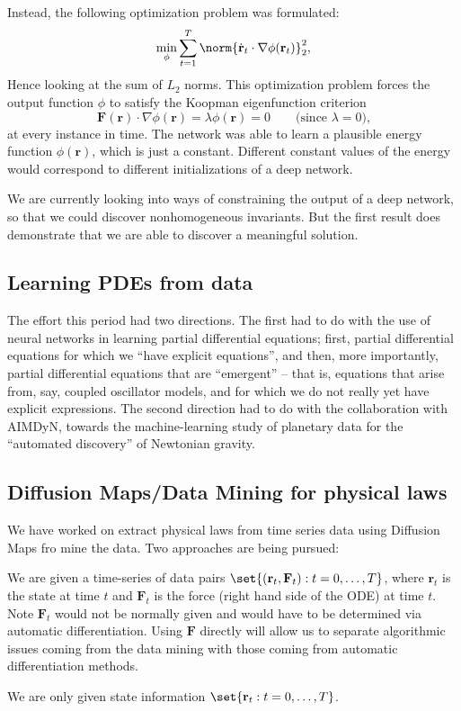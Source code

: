 \documentclass[11pt]{article}
\newcommand{\mbf}{\mathbf} 			%
\theoremstyle{plain}
\theoremstyle{remark}
\theoremstyle{definition}
\begin{document}
Instead, the following optimization problem was formulated:
\begin{equation}
\min_{\phi} \sum_{t=1}^T \norm{ \dot{\mbf r}_t \cdot \nabla  \phi(\mbf{r}_t) }_2^2 ,
\end{equation}
Hence looking at the sum of $L_2$ norms. This optimization problem forces the output function $\phi$ to satisfy the Koopman eigenfunction criterion
	\begin{equation}
	\mbf F(\mbf r) \cdot \nabla \phi(\mbf r) = \lambda \phi(\mbf r) = 0 \qquad \text{(since $\lambda = 0$),}
	\end{equation}
at every instance in time. The network was able to learn a 
plausible energy function $\phi(\mbf r)$, which is just a constant. Different constant values of the energy would correspond to different 
initializations of a deep network. 

We are currently looking into ways of constraining the output of a deep network,
so that we could discover nonhomogeneous invariants. But the first result does demonstrate that we are able to discover a meaningful solution. 

\subsection{Learning PDEs from data}
The effort this period had two directions. The first had to do with the use of neural networks in learning partial differential equations; first, partial differential equations for which we ``have explicit equations'', and then, more importantly,
partial differential equations that are ``emergent'' -- that is, equations that arise from, say, coupled oscillator models, and for which we do not really yet have explicit expressions. The second direction had to do with the collaboration with AIMDyN, towards the machine-learning study of planetary data for the ``automated discovery'' of Newtonian gravity. 

\subsection{Diffusion Maps/Data Mining for physical laws}
We have worked on extract physical laws from time series data using Diffusion Maps fro mine the data. Two approaches are being pursued:
\begin{compactenum}[(a)]
\item We are given a time-series of data pairs $\set{ (\mbf r_t, \mbf F_t) : t=0,\dots, T}$, where $\mbf r_t$ is the state at time $t$ and $\mbf F_t$ is the force (right hand side of the ODE) at time $t$. Note $\mbf F_t$ would not be normally given and would have to be determined via automatic differentiation. Using $\mbf F$ directly will allow us to separate algorithmic issues coming from the data mining with those coming from automatic differentiation methods.
\item We are only given state information $\set{ \mbf r_t : t=0,\dots, T}$.
\end{compactenum}
\end{document}
